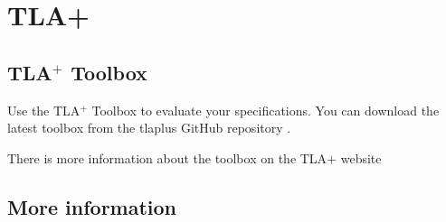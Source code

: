 
\chapter{TLA+} %

\label{AppendixA} %

\section{ TLA\(^+\) Toolbox}
Use the  TLA\(^+\) Toolbox to evaluate your specifications. You can download the
latest toolbox from the tlaplus GitHub repository \parencite{tlaplus_github_release}.

There is more information about the toolbox on the TLA\(+\) website \parencite{The_TLA_Toolbox}


\section{More information}